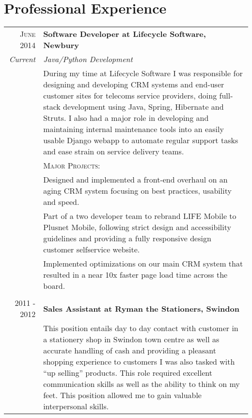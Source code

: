 \section{Professional Experience}
\begin{tabular}{r|p{11cm}}
	\textsc{June 2014} & \textbf{Software Developer at Lifecycle Software, Newbury} \\
	\emph{Current} & \emph{Java/Python Development} \\

	&\footnotesize{
	During my time at Lifecycle Software I was responsible for designing and developing CRM systems and end-user customer sites for telecoms service providers, doing full-stack development using Java, Spring, Hibernate and Struts. 
	I also had a major role in developing and maintaining internal maintenance tools into an easily usable Django webapp to automate regular support tasks and ease strain on service delivery teams.
	} \\

		\ & \vspace{1pt}  \textsc{Major Projects}: \\
	&\tabitem Designed and implemented a front-end overhaul on an aging CRM system focusing on best practices, usability and speed. \\ 
	&\tabitem Part of a two developer team to rebrand LIFE Mobile to Plusnet Mobile, following strict design and accessibility guidelines and providing a fully responsive design customer selfservice website. \\
	&\tabitem Implemented optimizations on our main CRM system that resulted in a near 10x faster page load time across the board. \\
	
	\multicolumn{2}{c}{} \\
	\textsc{2011 - 2012} & \textbf{Sales Assistant at Ryman the Stationers, Swindon} \\
	&\footnotesize{
	This position entails day to day contact with customer in a stationery shop in Swindon town centre as well as accurate handling of cash and providing a pleasant shopping experience to customers I was also tasked with “up selling” products. This role required excellent communication skills as well as the ability to think on my feet. 
	This position allowed me to gain valuable interpersonal skills.
	} \\

\end{tabular}